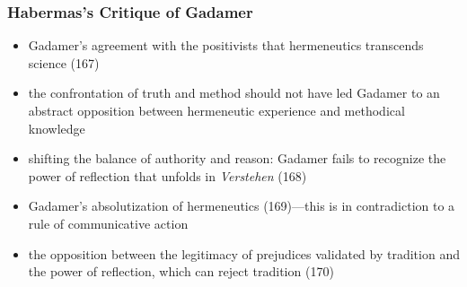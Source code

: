 \documentclass[xcolor=dvipsnames]{beamer}
\begin{document}
\begin{frame}
  \frametitle{Habermas's Critique of Gadamer}
  \begin{itemize}
  \item Gadamer's agreement with the positivists that hermeneutics
    transcends science (167)
  \item the confrontation of truth and method should not have led
    Gadamer to an abstract opposition between hermeneutic experience
    and methodical knowledge
  \item shifting the balance of authority and reason: Gadamer fails to
    recognize the power of reflection that unfolds in \emph{Verstehen}
    (168)
  \item Gadamer's absolutization of hermeneutics (169)---this is in
    contradiction to a rule of communicative action
  \item the opposition between the legitimacy of prejudices validated
    by tradition and the power of reflection, which can reject
    tradition (170)
  \end{itemize}
\end{frame}
\end{document}
